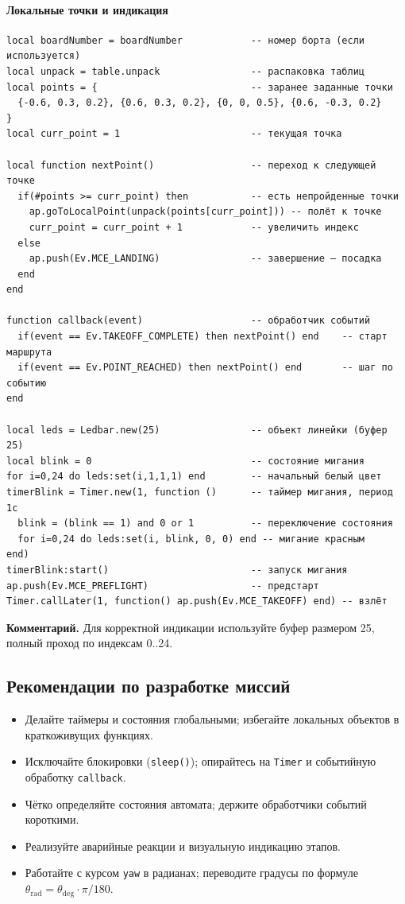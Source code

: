 \paragraph{Локальные точки и индикация}
\begin{verbatim}
local boardNumber = boardNumber            -- номер борта (если используется)
local unpack = table.unpack                -- распаковка таблиц
local points = {                           -- заранее заданные точки
  {-0.6, 0.3, 0.2}, {0.6, 0.3, 0.2}, {0, 0, 0.5}, {0.6, -0.3, 0.2}
}
local curr_point = 1                       -- текущая точка

local function nextPoint()                 -- переход к следующей точке
  if(#points >= curr_point) then           -- есть непройденные точки
    ap.goToLocalPoint(unpack(points[curr_point])) -- полёт к точке
    curr_point = curr_point + 1            -- увеличить индекс
  else
    ap.push(Ev.MCE_LANDING)                -- завершение — посадка
  end
end

function callback(event)                   -- обработчик событий
  if(event == Ev.TAKEOFF_COMPLETE) then nextPoint() end    -- старт маршрута
  if(event == Ev.POINT_REACHED) then nextPoint() end       -- шаг по событию
end

local leds = Ledbar.new(25)                -- объект линейки (буфер 25)
local blink = 0                            -- состояние мигания
for i=0,24 do leds:set(i,1,1,1) end        -- начальный белый цвет
timerBlink = Timer.new(1, function ()      -- таймер мигания, период 1с
  blink = (blink == 1) and 0 or 1          -- переключение состояния
  for i=0,24 do leds:set(i, blink, 0, 0) end -- мигание красным
end)
timerBlink:start()                         -- запуск мигания
ap.push(Ev.MCE_PREFLIGHT)                  -- предстарт
Timer.callLater(1, function() ap.push(Ev.MCE_TAKEOFF) end) -- взлёт
\end{verbatim}
\textbf{Комментарий.} Для корректной индикации используйте буфер размером 25, полный проход по индексам 0..24.

\subsection{Рекомендации по разработке миссий}
\begin{itemize}
  \item Делайте таймеры и состояния глобальными; избегайте локальных объектов в краткоживущих функциях.
  \item Исключайте блокировки (\texttt{sleep()}); опирайтесь на \texttt{Timer} и событийную обработку \texttt{callback}.
  \item Чётко определяйте состояния автомата; держите обработчики событий короткими.
  \item Реализуйте аварийные реакции и визуальную индикацию этапов.
  \item Работайте с курсом \texttt{yaw} в радианах; переводите градусы по формуле \(\theta_{\mathrm{rad}}=\theta_{\mathrm{deg}}\cdot\pi/180\).
\end{itemize}
